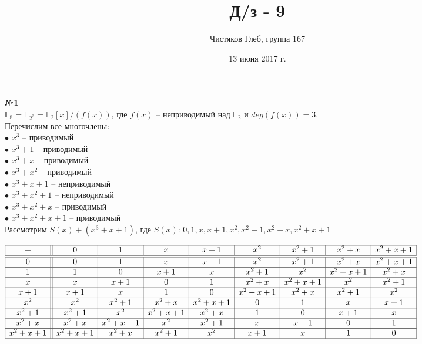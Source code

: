 \documentclass[a4paper, 12pt]{article}
\begin{document}
	\title{Д/з - 9}
	\author{Чистяков Глеб, группа 167}
	\date{13 июня 2017 г.}
	
	\maketitle
	
	\textbf{№1} \\
	
	$\mathbb{F}_8 = \mathbb{F}_{2^3} = \mathbb{F}_2[x]/(f(x))$, где $f(x)$ -- неприводимый над $\mathbb{F}_2$ и $deg(f(x)) = 3$. \\
	Перечислим все многочлены: \\
	$\bullet$ $x^3$ -- приводимый \\
	$\bullet$ $x^3 + 1$ -- приводимый \\
	$\bullet$ $x^3 + x$ -- приводимый \\
	$\bullet$ $x^3 + x^2$ -- приводимый \\
	$\bullet$ $x^3 + x + 1$ -- неприводимый \\
	$\bullet$ $x^3 + x^2 + 1$ -- неприводимый \\
	$\bullet$ $x^3 + x^2 + x$ -- приводимый \\
	$\bullet$ $x^3 + x^2 + x + 1$ -- приводимый \\
	Рассмотрим $S(x)+(x^3+x+1)$, где $S(x)$: $0, 1, x, x+1, x^2, x^2+1, x^2+x, x^2+x+1$ \\
	\begin{addmargin}[-3.5em]{0em}
		$\begin{array}{|c||c|c|c|c|c|c|c|c|} \hline
			+       & 0       & 1       & x       & x+1     & x^2     & x^2+1   & x^2+x   & x^2+x+1 \\
			\hline
			\hline
			0       & 0       & 1       & x       & x+1     & x^2     & x^2+1   & x^2+x   & x^2+x+1 \\
			\hline
			1       & 1       & 0       & x+1     & x       & x^2+1   & x^2     & x^2+x+1 & x^2+x   \\
			\hline
			x       & x       & x+1     & 0       & 1       & x^2+x   & x^2+x+1 & x^2     & x^2+1   \\
			\hline
			x+1     & x+1     & x       & 1       & 0       & x^2+x+1 & x^2+x   & x^2+1   & x^2     \\
			\hline
			x^2     & x^2     & x^2+1   & x^2+x   & x^2+x+1 & 0       & 1       & x       & x+1     \\
			\hline
			x^2+1   & x^2+1   & x^2     & x^2+x+1 & x^2+x   & 1       & 0       & x+1     & x       \\
			\hline
			x^2+x   & x^2+x   & x^2+x+1 & x^2     & x^2+1   & x       & x+1     & 0       & 1       \\
			\hline
			x^2+x+1 & x^2+x+1 & x^2+x   & x^2+1   & x^2     & x+1     & x       & 1       & 0       \\
			\hline
		\end{array}$ \\\\
	\end{addmargin}
\end{document}
